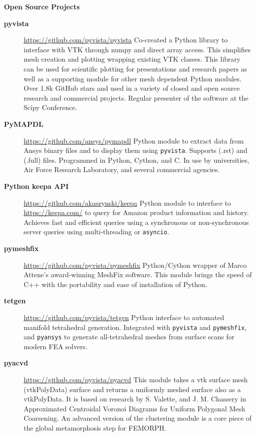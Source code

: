 \documentclass[letterpaper,11pt]{article}
\newcommand{\resheading}[1]{{\large \colorbox{mygrey}{\begin{minipage}{\textwidth}{\textbf{#1 \vphantom{p\^{E}}}}\end{minipage}}}}
\begin{document}
\resheading{Open Source Projects}

\begin{description}
\item[\textbf{pyvista}] \url{https://github.com/pyvista/pyvista} \newline
  Co-created a Python library to interface with VTK through numpy and direct array access. This simplifies mesh creation and plotting wrapping existing VTK classes. This library can be used for scientific plotting for presentations and research papers as well as a supporting module for other mesh dependent Python modules. Over 1.8k GitHub stars and used in a variety of closed and open source research and commercial projects. Regular presenter of the software at the Scipy Conference.
\item[\textbf{PyMAPDL}] \url{https://github.com/ansys/pymapdl} \newline
  Python module to extract data from Ansys binary files and to display them using \texttt{pyvista}. Supports (.rst) and (.full) files. Programmed in Python, Cython, and C. In use by universities, Air Force Research Laboratory, and several commercial agencies.
\item[\textbf{Python keepa API}] \url{https://github.com/akaszynski/keepa} \newline
Python module to interface to \url{https://keepa.com/} to query for Amazon product information and history. Achieves fast and efficient queries using a synchronous or non-synchronous server queries using multi-threading or \texttt{asyncio}.
\item[\textbf{pymeshfix}] \url{https://github.com/pyvista/pymeshfix} \newline
Python/Cython wrapper of Marco Attene's award-winning MeshFix software. This module brings the speed of C++ with the portability and ease of installation of Python.
\item[\textbf{tetgen}] \url{https://github.com/pyvista/tetgen} \newline
Python interface to automated manifold tetrahedral generation. Integrated with \texttt{pyvista} and \texttt{pymeshfix}, and \texttt{pyansys} to generate all-tetrahedral meshes from surface scans for modern FEA solvers.
\item[\textbf{pyacvd}] \url{https://github.com/pyvista/pyacvd} \newline
  This module takes a vtk surface mesh (vtkPolyData) surface and returns a uniformly meshed surface also as a vtkPolyData. It is based on research by S. Valette, and J. M. Chassery in Approximated Centroidal Voronoi Diagrams for Uniform Polygonal Mesh Coarsening. An advanced version of the clustering module is a core piece of the global metamorphosis step for FEMORPH.
\end{description}
\end{document}
